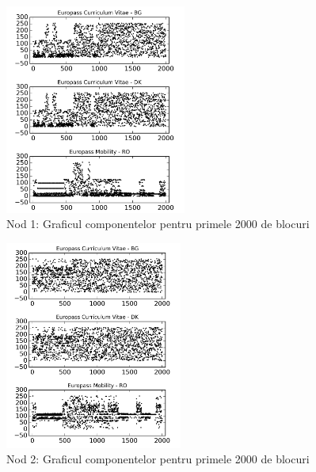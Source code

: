 \documentclass[oneside, 12pt]{book}
\begin{document}
\begin{figure}[b!]
\begin{center}{}
\includegraphics[width=0.53\textwidth]{img/db1.png}    %
\caption{Nod 1: Graficul componentelor pentru primele 2000 de blocuri} 
\label{fig:db1}
\end{center}
\end{figure}



\begin{figure}[t!]
\begin{center}
\includegraphics[width=0.52\textwidth]{img/db2.png}    %
\caption{Nod 2: Graficul componentelor pentru primele 2000 de blocuri} 
\label{fig:db2}
\end{center}
\end{figure}
\end{document}
